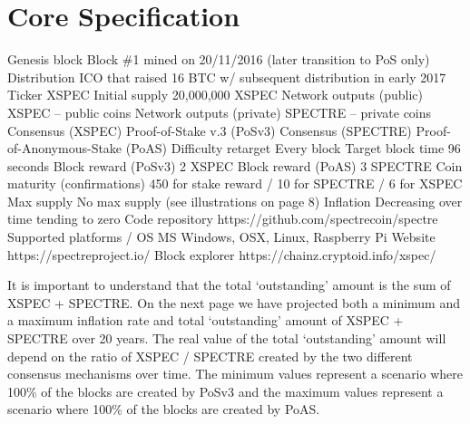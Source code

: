 \section{Core Specification}
Genesis block Block \#1 mined on 20/11/2016 (later transition to PoS only)
Distribution ICO that raised 16 BTC w/ subsequent distribution in early 2017
Ticker XSPEC
Initial supply 20,000,000 XSPEC
Network outputs (public) XSPEC – public coins
Network outputs (private) SPECTRE – private coins
Consensus (XSPEC) Proof-of-Stake v.3 (PoSv3)
Consensus (SPECTRE) Proof-of-Anonymous-Stake (PoAS)
Difficulty retarget Every block
Target block time 96 seconds
Block reward (PoSv3) 2 XSPEC
Block reward (PoAS) 3 SPECTRE
Coin maturity (confirmations) 450 for stake reward / 10 for SPECTRE / 6 for XSPEC
Max supply No max supply (see illustrations on page 8)
Inflation Decreasing over time tending to zero
Code repository https://github.com/spectrecoin/spectre
Supported platforms / OS MS Windows, OSX, Linux, Raspberry Pi
Website https://spectreproject.io/
Block explorer https://chainz.cryptoid.info/xspec/



It is important to understand that the total ‘outstanding’ amount is the sum
of XSPEC + SPECTRE. On the next page we have projected both a minimum and a
maximum inflation rate and total ‘outstanding’ amount of XSPEC + SPECTRE over
20 years. The real value of the total ‘outstanding’ amount will depend on the
ratio of XSPEC / SPECTRE created by the two different consensus mechanisms
over time. The minimum values represent a scenario where 100\% of the blocks
are created by PoSv3 and the maximum values represent a scenario where 100\%
of the blocks are created by PoAS.